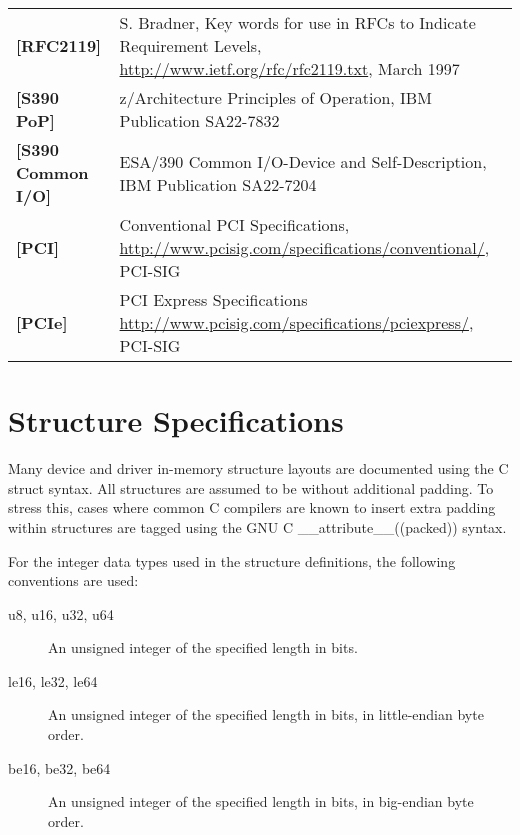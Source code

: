 \begin{longtable}{l p{5in}}
	\label{intro:rfc2119}\textbf{[RFC2119]} & S. Bradner, Key words for use in RFCs to Indicate Requirement Levels, \newline\url{http://www.ietf.org/rfc/rfc2119.txt}, March 1997\\
	\label{intro:S390 PoP}\textbf{[S390 PoP]} & z/Architecture Principles of Operation, \newline IBM Publication SA22-7832\\
	\label{intro:S390 Common I/O}\textbf{[S390 Common I/O]} & ESA/390 Common I/O-Device and Self-Description, \newline IBM Publication SA22-7204\\
	\label{intro:PCI}\textbf{[PCI]} &
	Conventional PCI Specifications,
	\newline\url{http://www.pcisig.com/specifications/conventional/},
	PCI-SIG\\
	\label{intro:PCIe}\textbf{[PCIe]} &
	PCI Express Specifications
	\newline\url{http://www.pcisig.com/specifications/pciexpress/},
	PCI-SIG\\
\end{longtable}

\section{Structure Specifications}

Many device and driver in-memory structure layouts are documented using
the C struct syntax. All structures are assumed to be without additional
padding. To stress this, cases where common C compilers are known to insert
extra padding within structures are tagged using the GNU C
__attribute__((packed))  syntax.

For the integer data types used in the structure definitions, the following
conventions are used:

\begin{description}
\item[u8, u16, u32, u64] An unsigned integer of the specified length in bits.

\item[le16, le32, le64] An unsigned integer of the specified length in bits,
in little-endian byte order.

\item[be16, be32, be64] An unsigned integer of the specified length in bits,
in big-endian byte order.
\end{description}

\newpage

